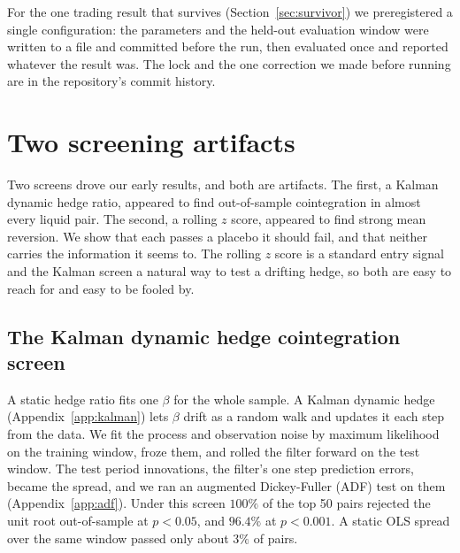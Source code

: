\documentclass[11pt]{article}
\begin{document}
For the one trading result that survives (Section~\ref{sec:survivor}) we preregistered a single
configuration: the parameters and the held-out evaluation window were written to a file and
committed before the run, then evaluated once and reported whatever the result was. The lock and
the one correction we made before running are in the repository's commit history.

\section{Two screening artifacts}
\label{sec:artifacts}

Two screens drove our early results, and both are artifacts. The first, a Kalman dynamic
hedge ratio, appeared to find out-of-sample cointegration in almost every liquid pair. The
second, a rolling $z$ score, appeared to find strong mean reversion. We show that each passes
a placebo it should fail, and that neither carries the information it seems to. The rolling $z$ score is a standard entry signal and the
Kalman screen a natural way to test a drifting hedge, so both are easy to reach for and easy to be
fooled by.

\subsection{The Kalman dynamic hedge cointegration screen}
\label{sec:kalman}

A static hedge ratio fits one $\beta$ for the whole sample. A Kalman dynamic hedge (Appendix~\ref{app:kalman}) lets
$\beta$ drift as a random walk and updates it each step from the data. We fit the process and
observation noise by maximum likelihood on the training window, froze them, and rolled the
filter forward on the test window. The test period innovations, the filter's one step
prediction errors, became the spread, and we ran an augmented Dickey-Fuller (ADF) test on
them~\cite{saiddickey1984} (Appendix~\ref{app:adf}). Under this screen $100\%$ of the top 50 pairs rejected the unit root out-of-sample at
$p<0.05$, and $96.4\%$ at $p<0.001$. A static OLS spread over the same window passed only
about $3\%$ of pairs.
\end{document}
